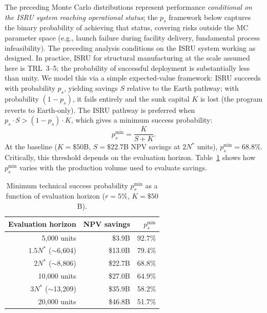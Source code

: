 \documentclass[preprint,12pt]{elsarticle}
\begin{document}
The preceding Monte Carlo distributions represent performance \emph{conditional on the ISRU system reaching operational status}; the $p_s$ framework below captures the binary probability of achieving that status, covering risks outside the MC parameter space (e.g., launch failure during facility delivery, fundamental process infeasibility). The preceding analysis conditions on the ISRU system working as designed. In practice, ISRU for structural manufacturing at the scale assumed here is TRL~3--5; the probability of successful deployment is substantially less than unity. We model this via a simple expected-value framework: ISRU succeeds with probability $p_s$, yielding savings $S$ relative to the Earth pathway; with probability $(1 - p_s)$, it fails entirely and the sunk capital $K$ is lost (the program reverts to Earth-only). The ISRU pathway is preferred when $p_s \cdot S > (1 - p_s) \cdot K$, which gives a minimum success probability:
\begin{equation}
  p_s^{\min} = \frac{K}{S + K}.
  \label{eq:p_success}
\end{equation}
At the baseline ($K = \$50$B, $S = \$22.7$B NPV savings at $2N^*$ units), $p_s^{\min} = 68.8\%$. Critically, this threshold depends on the evaluation horizon. Table~\ref{tab:ps_horizon} shows how $p_s^{\min}$ varies with the production volume used to evaluate savings.

\begin{table}[htbp]
\centering
\caption{Minimum technical success probability $p_s^{\min}$ as a function of evaluation horizon ($r = 5\%$, $K = \$50$B).}
\label{tab:ps_horizon}
\small
\begin{tabular}{@{}rrr@{}}
\toprule
Evaluation horizon & NPV savings & $p_s^{\min}$ \\
\midrule
5{,}000 units            & \$3.9B   & 92.7\% \\
$1.5 N^*$ ($\sim$6{,}604) & \$13.0B  & 79.4\% \\
$2 N^*$ ($\sim$8{,}806)   & \$22.7B  & 68.8\% \\
10{,}000 units           & \$27.0B  & 64.9\% \\
$3 N^*$ ($\sim$13{,}209)  & \$35.9B  & 58.2\% \\
20{,}000 units           & \$46.8B  & 51.7\% \\
\bottomrule
\end{tabular}
\end{table}
\end{document}
